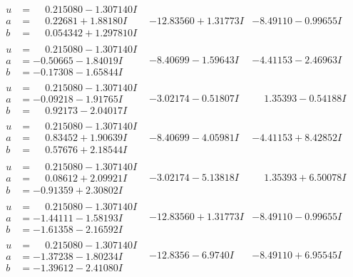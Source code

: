 \documentclass[1p]{elsarticle_modified}
\theoremstyle{definition}
\begin{document}
$$\begin{array}{c|c|c}
\begin{aligned}
u &= \phantom{-}0.215080 - 1.307140 I \\
a &= \phantom{-}0.22681 + 1.88180 I \\
b &= \phantom{-}0.054342 + 1.297810 I\end{aligned}
 & -12.83560 + 1.31773 I & -8.49110 - 0.99655 I \\ \hline\begin{aligned}
u &= \phantom{-}0.215080 - 1.307140 I \\
a &= -0.50665 - 1.84019 I \\
b &= -0.17308 - 1.65844 I\end{aligned}
 & -8.40699 - 1.59643 I & -4.41153 - 2.46963 I \\ \hline\begin{aligned}
u &= \phantom{-}0.215080 - 1.307140 I \\
a &= -0.09218 - 1.91765 I \\
b &= \phantom{-}0.92173 - 2.04017 I\end{aligned}
 & -3.02174 - 0.51807 I & \phantom{-}1.35393 - 0.54188 I \\ \hline\begin{aligned}
u &= \phantom{-}0.215080 - 1.307140 I \\
a &= \phantom{-}0.83452 + 1.90639 I \\
b &= \phantom{-}0.57676 + 2.18544 I\end{aligned}
 & -8.40699 - 4.05981 I & -4.41153 + 8.42852 I \\ \hline\begin{aligned}
u &= \phantom{-}0.215080 - 1.307140 I \\
a &= \phantom{-}0.08612 + 2.09921 I \\
b &= -0.91359 + 2.30802 I\end{aligned}
 & -3.02174 - 5.13818 I & \phantom{-}1.35393 + 6.50078 I \\ \hline\begin{aligned}
u &= \phantom{-}0.215080 - 1.307140 I \\
a &= -1.44111 - 1.58193 I \\
b &= -1.61358 - 2.16592 I\end{aligned}
 & -12.83560 + 1.31773 I & -8.49110 - 0.99655 I \\ \hline\begin{aligned}
u &= \phantom{-}0.215080 - 1.307140 I \\
a &= -1.37238 - 1.80234 I \\
b &= -1.39612 - 2.41080 I\end{aligned}
 & -12.8356 - 6.9740 I & -8.49110 + 6.95545 I \\ \hline\begin{aligned}

\end{aligned}
\end{array}$$
\end{document}
